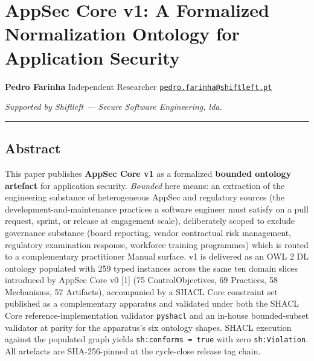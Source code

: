\documentclass[
]{article}
\author{}
\date{}
\begin{document}
\section{AppSec Core v1: A Formalized Normalization Ontology for
Application
Security}\label{appsec-core-v1-a-formalized-normalization-ontology-for-application-security}

\textbf{Pedro Farinha} Independent Researcher
\href{mailto:pedro.farinha@shiftleft.pt}{\nolinkurl{pedro.farinha@shiftleft.pt}}

\emph{Supported by Shiftleft --- Secure Software Engineering, lda.}

\begin{center}\rule{0.5\linewidth}{0.5pt}\end{center}

\subsection{Abstract}\label{abstract}

This paper publishes \textbf{AppSec Core v1} as a formalized
\textbf{bounded ontology artefact} for application security.
\emph{Bounded} here means: an extraction of the engineering substance of
heterogeneous AppSec and regulatory sources (the
development-and-maintenance practices a software engineer must satisfy
on a pull request, sprint, or release at engagement scale), deliberately
scoped to exclude governance substance (board reporting, vendor
contractual risk management, regulatory examination response, workforce
training programmes) which is routed to a complementary practitioner
Manual surface. v1 is delivered as an OWL 2 DL ontology populated with
259 typed instances across the same ten domain slices introduced by
AppSec Core v0 {[}1{]} (75 ControlObjectives, 69 Practices, 58
Mechanisms, 57 Artifacts), accompanied by a SHACL Core constraint set
published as a complementary apparatus and validated under both the
SHACL Core reference-implementation validator \texttt{pyshacl} and an
in-house bounded-subset validator at parity for the apparatus's six
ontology shapes. SHACL execution against the populated graph yields
\texttt{sh:conforms\ =\ true} with zero \texttt{sh:Violation}. All
artefacts are SHA-256-pinned at the cycle-close release tag chain.
\end{document}

